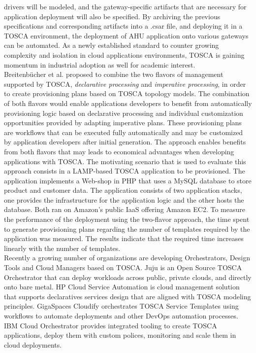 drivers will be modeled, and the gateway-specific artifacts that are necessary for application deployment
will also be specified. By archiving the previous specifications and corresponding artifacts into a .csar file,
and deploying it in a TOSCA environment, the deployment of AHU application onto various gateways can be automated.
As a newly established standard to counter growing complexity and isolation in cloud applications environments,
TOSCA is gaining momentum in industrial adoption as well for academic interest.\\
Breitenb\"{u}cher et al. \cite{breitenbucher2014combining} proposed to combine the two flavors of management
supported by TOSCA, \textit{declarative processing} and \textit{imperative processing}, in order to create
provisioning plans based on TOSCA topology models. The combination of both flavors would enable applications
developers to benefit from automatically provisioning logic based on declarative processing and individual
customization opportunities provided by adapting imperative plans. These provisioning plans are workflows that
can be executed fully automatically and may be customized by application developers after initial generation.
The approach enables benefits from both flavors that may leads to economical advantages when developing applications
with TOSCA. The motivating scenario that is used to evaluate this approach consists in a LAMP-based TOSCA
application to be provisioned. The application implements a Web-shop in PHP that uses a MySQL database to store
product and customer data. The application consists of two application stacks, one provides the infrastructure
for the application logic and the other hosts the database. Both ran on Amazon's public IaaS offering
Amazon EC2. To measure the performance of the deployment using the two-flavor approach, the time spent to
generate provisioning plans regarding the number of templates required by the application was measured.
The results indicate that the required time increases linearly with the number of templates.\\

Recently a growing number of organizations are developing Orchestrators, Design Tools and Cloud Managers
based on TOSCA. Juju is an Open Source TOSCA Orchestrator that can deploy workloads across public, private clouds,
and directly onto bare metal. HP Cloud Service Automation is cloud management solution that supports declaratives
services design that are aligned with TOSCA modeling principles. GigaSpaces Cloudify orchestrates TOSCA Service
Templates using workflows to automate deployments and other DevOps automation processes. IBM Cloud Orchestrator
provides integrated tooling to create TOSCA applications, deploy them with custom polices, monitoring and scale
them in cloud deployments.\\

